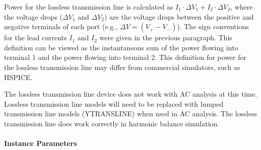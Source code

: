 \begin{Device}
Power for the lossless transmission line is calculated as $I_1 \cdot \Delta V_1 + 
I_2 \cdot \Delta V_2$, where the voltage drops ($\Delta V_1$ and $\Delta V_2$) are the 
voltage drops between the positive and negative terminals of each port (e.g., 
$\Delta V = (V_+ - V_-)$).  The sign conventions for the lead currents $I_1$ and $I_2$ 
were given in the previous paragraph.  This definition can be viewed as the instantaneous
sum of the power flowing into terminal 1 and the power flowing into terminal 2.
This definition for power for the lossless transmission line may differ from 
commercial simulators, such as HSPICE.  

The lossless transmission line device does not work with AC analysis
at this time.  Lossless transmission line models will need to be
replaced with lumped transmission line models (YTRANSLINE) when used
in AC analysis.  The lossless transmission line does work correctly in
harmonic balance simulation.

\end{Device}

\paragraph{Instance Parameters}

